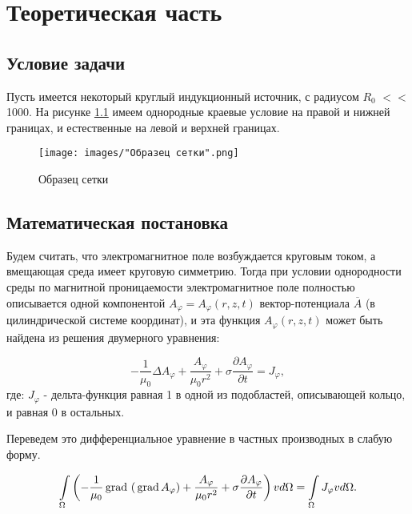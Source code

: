 \chapter{Теоретическая часть}

\section{Условие задачи}

Пусть имеется некоторый круглый индукционный источник, с радиусом $R_0$ $<<$ 1000. На рисунке \ref{fig:areaExample} имеем однородные краевые условие на правой и нижней границах, и естественные на левой и верхней границах.

\begin{figure}
	\centering
	\texttt{[image: images/"Образец сетки".png]}
	\caption{Образец сетки}
	\label{fig:areaExample}
\end{figure}

\section{Математическая постановка}

Будем считать, что электромагнитное поле возбуждается круговым током, а вмещающая среда имеет круговую симметрию. Тогда при условии однородности среды по магнитной проницаемости электромагнитное поле полностью описывается одной компонентой $A_{\varphi} = A_{\varphi}(r, z, t)$ вектор-потенциала $\overline{A}$ (в цилиндрической системе координат), и эта функция $A_{\varphi}(r, z, t)$ может быть найдена из решения двумерного уравнения:

\begin{equation} \label{eq1M}
	-\frac{1}{\mu_0} \Delta A_{\varphi} + \frac{A_{\varphi}}{\mu_0 r^2} + \sigma \frac{\partial A_{\varphi}}{\partial t} = J_{\varphi},
\end{equation}
где: $J_{\varphi}$ - дельта-функция равная 1 в одной из подобластей, описывающей кольцо, и равная 0 в остальных.

Переведем это дифференциальное уравнение в частных производных в слабую форму.

\begin{equation} \label{eq2}
	\int \limits_{\Omega} \left(-\frac{1}{\mu_0} \, \mathrm{grad} \, \left(\, \mathrm{grad} \,{A_{\varphi}}\right) + \frac{A_{\varphi}}{\mu_0 r^2} + \sigma \frac{\partial A_{\varphi}}{\partial t}\right) v d \Omega = \int \limits_{\Omega} J_{\varphi} v d \Omega.
\end{equation}

